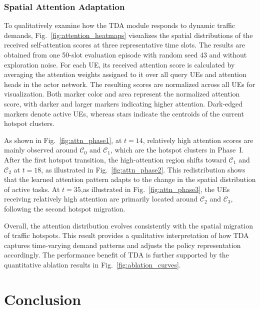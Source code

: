 \documentclass[journal]{IEEEtran}
\begin{document}
\subsubsection{Spatial Attention Adaptation}
To qualitatively examine how the TDA module responds to dynamic
traffic demands, Fig.~\ref{fig:attention_heatmaps} visualizes
the spatial distributions of the received self-attention scores at
three representative time slots. The results are obtained from one
50-slot evaluation episode with random seed 43 and without exploration
noise. For each UE, its received attention score is calculated by
averaging the attention weights assigned to it over all query UEs and
attention heads in the actor network. The resulting scores are
normalized across all UEs for visualization. Both marker color and
area represent the normalized attention score, with darker and larger
markers indicating higher attention. Dark-edged markers denote active
UEs, whereas stars indicate the centroids of the current hotspot
clusters.

As shown in Fig.~\ref{fig:attn_phase1}, at $t=14$,
relatively high attention scores are mainly observed around $\mathcal{C}_0$
and $\mathcal{C}_1$, which are the hotspot clusters in Phase~I. After the first
hotspot transition, the high-attention region shifts toward $\mathcal{C}_1$
and $\mathcal{C}_2$ at $t=18$, as illustrated in
Fig.~\ref{fig:attn_phase2}. This redistribution shows
that the learned attention pattern adapts to the change in the spatial
distribution of active tasks. At $t=35$,as illustrated in
Fig.~\ref{fig:attn_phase3}, the UEs receiving relatively
high attention are primarily located around $\mathcal{C}_2$ and $\mathcal{C}_3$, following
the second hotspot migration.

Overall, the attention distribution evolves consistently with the
spatial migration of traffic hotspots. This result provides a
qualitative interpretation of how TDA captures time-varying demand
patterns and adjusts the policy representation accordingly. The
performance benefit of TDA is further supported by the quantitative
ablation results in Fig.~\ref{fig:ablation_curves}.

\section{Conclusion}
\end{document}
